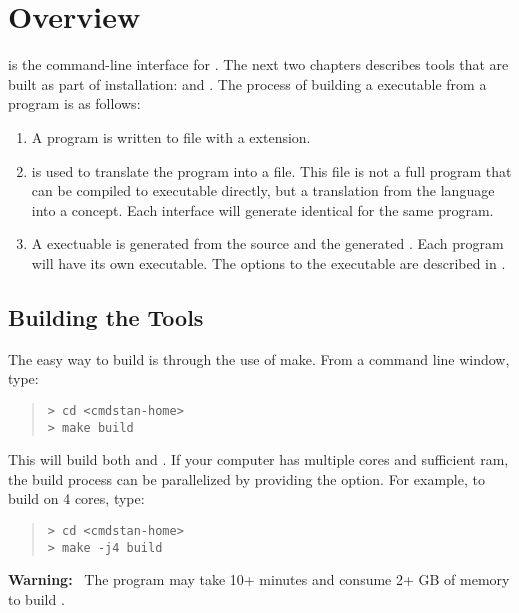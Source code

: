 \chapter{Overview}

\noindent
\CmdStan is the command-line interface for \Stan. The next two
chapters describes tools that are built as part of \CmdStan
installation:  and . The process of building a
\CmdStan executable from a \Stan program is as follows:
%
\begin{enumerate}
  \item A \Stan program is written to file with a 
    extension.
  \item {} is used to translate the \Stan program into a
    \Cpp file. This \Cpp file is not a full program that can be
    compiled to executable directly, but a translation from the \Stan
    language into a \Cpp concept. Each interface will generate identical
    \Cpp for the same \Stan program.
  \item A \CmdStan exectuable is generated from the \CmdStan source
    and the generated \Cpp. Each \Stan program will have its own
    \CmdStan executable. The options to the \CmdStan executable are
    described in .
\end{enumerate}


\section{Building the \CmdStan Tools}\label{build.section}

The easy way to build \CmdStan is through the use of make. From a
command line window, type:
%
\begin{quote}
\begin{Verbatim}[fontshape=sl,fontsize=\small]
> cd <cmdstan-home>
> make build
\end{Verbatim}
\end{quote}
%
This will build both  and . If your computer
has multiple cores and sufficient ram, the build process can be parallelized
by providing the  option. For example, to build on 4 cores, type:
%
\begin{quote}
\begin{Verbatim}[fontshape=sl,fontsize=\small]
> cd <cmdstan-home>
> make -j4 build
\end{Verbatim}
\end{quote}
%
\textbf{Warning:} \ The  program may take 10+ minutes and
consume 2+ GB of memory to build \CmdStan.
